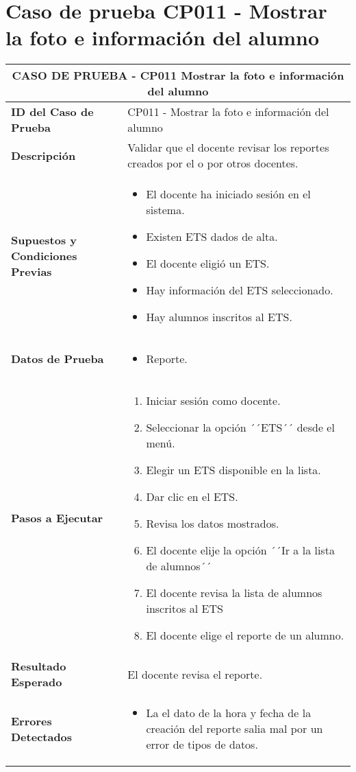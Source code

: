 \section{Caso de prueba CP011 - Mostrar la foto e información del alumno}

\begin{longtable}{|p{5cm}|p{10cm}|}
	\hline
	\multicolumn{2}{|c|}{\textbf{CASO DE PRUEBA - CP011 Mostrar la foto e información del alumno}} \\
	\hline
	\textbf{ID del Caso de Prueba} & CP011 - Mostrar la foto e información del alumno \\
	\hline
	\textbf{Descripción} & Validar que el docente revisar los reportes creados por el o por otros docentes. \\
	\hline
	\textbf{Supuestos y Condiciones Previas} & 
	\begin{itemize}
		\item El docente ha iniciado sesión en el sistema.
		\item Existen ETS dados de alta.
		\item El docente eligió un ETS.
		\item Hay información del ETS seleccionado.
		\item Hay alumnos inscritos al ETS.
		
	\end{itemize} \\
	\hline
	\textbf{Datos de Prueba} & 
	\begin{itemize}
		\item Reporte. 
	\end{itemize} \\
	\hline
	\textbf{Pasos a Ejecutar} & 
	\begin{enumerate}
		\item Iniciar sesión como docente.
		\item Seleccionar la opción ´´ETS´´ desde el menú.
		\item Elegir un ETS disponible en la lista.
		\item Dar clic en el ETS.
		\item Revisa los datos mostrados.
		\item El docente elije la opción ´´Ir a la lista de alumnos´´
		\item El docente revisa la lista de alumnos inscritos al ETS
		\item El docente elige el reporte de un alumno.
	\end{enumerate} \\
	\hline
	\textbf{Resultado Esperado} & 
	El docente revisa el reporte. \\	
	\hline
	\textbf{Errores Detectados} & 
	\begin{itemize}
		\item La el dato de la hora y fecha de la creación del reporte salia mal por un error de tipos de datos.


\end{itemize}
\end{longtable}

